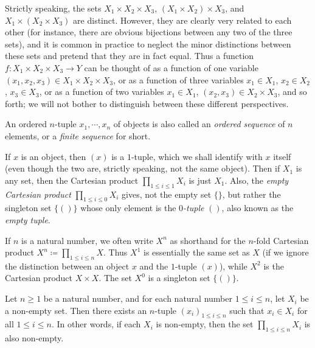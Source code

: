\begin{note}
Strictly speaking, the sets \(X_1 \times X_2 \times X_3\), \((X_1 \times X_2) \times X_3\), and \(X_1 \times (X_2 \times X_3)\) are distinct.
However, they are clearly very related to each other (for instance, there are obvious bijections between any two of the three sets), and it is common in practice to neglect the minor distinctions between these sets and pretend that they are in fact equal.
Thus a function \(f : X_1 \times X_2 \times X_3 \to Y\) can be thought of as a function of one variable \((x_1, x_2, x_3) \in X_1 \times X_2 \times X_3\), or as a function of three variables \(x_1 \in X_1\), \(x_2 \in X_2\), \(x_3 \in X_3\), or as a function of two variables \(x_1 \in X_1\), \((x_2, x_3) \in X_2 \times X_3\), and so forth;
we will not bother to distinguish between these different perspectives.
\end{note}

\setcounter{theorem}{9}
\begin{remark}\label{3.5.10}
An ordered \(n\)-tuple \(x_1, \cdots, x_n\) of objects is also called an \emph{ordered sequence} of \(n\) elements, or a \emph{finite sequence} for short.
\end{remark}

\begin{note}
If \(x\) is an object, then \((x)\) is a \(1\)-tuple, which we shall identify with \(x\) itself (even though the two are, strictly speaking, not the same object).
Then if \(X_1\) is any set, then the Cartesian product \(\prod_{1 \leq i \leq 1} X_i\) is just \(X_1\).
Also, the \emph{empty Cartesian product} \(\prod_{1 \leq i \leq 0} X_i\) gives, not the empty set \(\{\}\), but rather the singleton set \(\{()\}\) whose only element is the \emph{\(0\)-tuple} \(()\), also known as the \emph{empty tuple}.
\end{note}

\begin{note}
If \(n\) is a natural number, we often write \(X^n\) as shorthand for the \(n\)-fold Cartesian product \(X^n \coloneqq \prod_{1 \leq i \leq n} X\).
Thus \(X^1\) is essentially the same set as \(X\) (if we ignore the distinction between an object \(x\) and the \(1\)-tuple \((x)\)), while \(X^2\) is the Cartesian product \(X \times X\).
The set \(X^0\) is a singleton set \(\{()\}\).
\end{note}

\setcounter{theorem}{11}
\begin{lemma}\label{3.5.12}
Let \(n \geq 1\) be a natural number, and for each natural number \(1 \leq i \leq n\), let \(X_i\) be a non-empty set.
Then there exists an \(n\)-tuple \((x_i)_{1 \leq i \leq n}\) such that \(x_i \in X_i\) for all \(1 \leq i \leq n\).
In other words, if each \(X_i\) is non-empty, then the set \(\prod_{1 \leq i \leq n} X_i\) is also non-empty.
\end{lemma}

